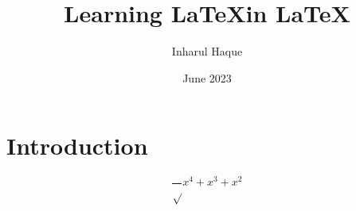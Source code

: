 \documentclass{book}
\title{\Huge{\textbf{Learning \LaTeX  in \LaTeX}}}
\author{\Large{Inharul Haque}}
\date{June 2023}
\begin{document}
\maketitle

\section{Introduction}
\begin{equation}
  \frac{} \sqrt{x^4+x^3+x^2}
\end{equation}
\end{document}
